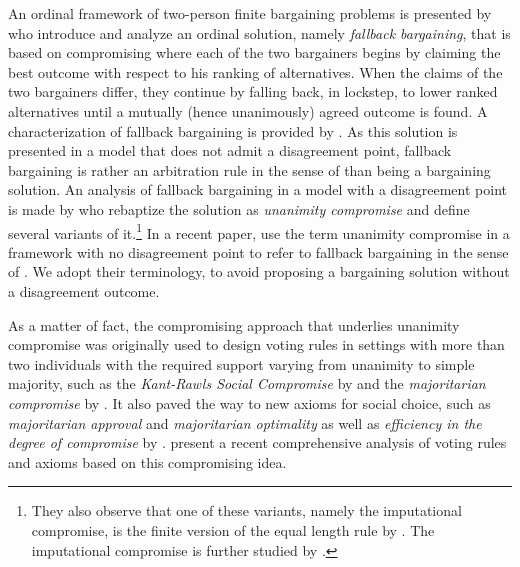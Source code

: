 \documentclass[pagesize, twoside=off, bibliography=totoc, DIV=calc, fontsize=12pt, a4paper]{scrartcl}
\begin{document}
An ordinal framework of two-person finite bargaining problems is presented by \citet{BramsKilgour2001} who introduce and analyze an ordinal solution, namely \textit{fallback bargaining}, that is based on compromising where each of the two bargainers begins by claiming the best outcome with respect to his ranking of alternatives. When the claims of the two bargainers differ, they continue by falling back, in lockstep, to lower ranked alternatives until a mutually (hence unanimously) agreed outcome is found. A characterization of fallback bargaining is provided by \citet{de2012reason}. As this solution is presented in a model that does not admit a disagreement point, fallback bargaining is rather an arbitration rule in the sense of \citet{Sprumont1993} than being a bargaining solution. An analysis of fallback bargaining in a model with a disagreement point is made by \citet{KibrisSertel2007} who rebaptize the solution as \textit{unanimity compromise} and define several variants of it.\footnote{They also observe that one of these variants, namely the imputational compromise, is the finite version of the equal length rule by \citet{thomson2019equal}. The imputational compromise is further studied by \citet{ConleyWilkie2012}.} In a recent paper, \citet{barbera2022compromising} use the term unanimity compromise in a framework with no disagreement point to refer to fallback bargaining in the sense of \citet{BramsKilgour2001}. We adopt their terminology, to avoid proposing a bargaining solution without a disagreement outcome.

As a matter of fact, the compromising approach that underlies unanimity compromise was originally used to design voting rules in settings with more than two individuals with the required support varying from unanimity to simple majority, such as the \textit{Kant-Rawls Social Compromise} by \citet{HurwiczSertel1997} and the \textit{majoritarian compromise} by \citet{sertel1999majoritarian}. It also paved the way to new axioms for social choice, such as \textit{majoritarian approval} and \textit{majoritarian optimality} as well as \textit{efficiency in the degree of compromise} by \citet{ozkal2004efficiency}.
\citet{merlin2019compromise} present a recent comprehensive analysis of voting rules and axioms based on this compromising idea.
\end{document}
